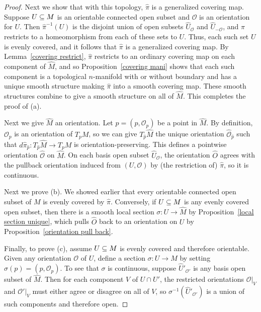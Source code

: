 \begin{proof}
Next we show that with this topology, $\widehat{\pi}$ is a generalized covering map. Suppose $U\subseteq M$ is an orientable connected open subset and $\mathcal{O}$ is an orientation for $U$. Then $\widehat{\pi}^{-1}(U)$ is the disjoint union of open subsets $\widehat{U}_{\mathcal{O}}$ and $\widehat{U}_{-\mathcal{O}}$, and $\widehat{\pi}$ restricts to a homeomorphism from each of these sets to $U$. Thus, each such set $U$ is evenly covered, and it follows that $\widehat{\pi}$ is a generalized covering map. By Lemma~\ref{covering restrict}, $\widehat{\pi}$ restricts to an ordinary covering map on each component of $\widehat{M}$, and so Proposition~\ref{covering mani} shows that each such component is a topological $n$-manifold with or without boundary and has a unique smooth structure making $\widehat{\pi}$ into a smooth covering map. These smooth structures combine to give a smooth structure on all of $\widehat{M}$. This completes the proof of (a).\par
Next we give $\widehat{M}$ an orientation. Let $\widehat{p}=(p,\mathcal{O}_p)$ be a point in $\widehat{M}$. By definition, $\mathcal{O}_p$ is an orientation of $T_pM$, so we can give $T_{\widehat{p}}\widehat{M}$ the unique orientation $\widehat{\mathcal{O}}_{\widehat{p}}$ such that $d\widehat{\pi}_{\widehat{p}}:T_{\widehat{p}}\widehat{M}\to T_pM$ is orientation-preserving. This defines a pointwise orientation $\widehat{\mathcal{O}}$ on $\widehat{M}$. On each basis open subset $\widehat{U}_{\mathcal{O}}$, the orientation $\widehat{O}$ agrees
with the pullback orientation induced from $(U,\mathcal{O})$ by (the restriction of) $\widehat{\pi}$, so it is continuous.\par
Next we prove (b). We showed earlier that every orientable connected open subset
of $M$ is evenly covered by $\widehat{\pi}$. Conversely, if $U\subseteq M$ is any evenly covered open subset, then there is a smooth local section $\sigma:U\to\widehat{M}$ by Proposition~\ref{local section unique}, which pulls $\widehat{O}$ back to an orientation on $U$ by Proposition~\ref{orientation pull back}.\par 
Finally, to prove (c), assume $U\subseteq M$ is evenly covered and therefore orientable. Given any orientation $\mathcal{O}$ of $U$, define a section $\sigma:U\to M$ by setting $\sigma(p)=(p,\mathcal{O}_p)$. To see that $\sigma$ is continuous, suppose $\widehat{U}'_{\mathcal{O}'}$ is any basis open subset of $\widehat{M}$. Then for each component $V$ of $U\cap U'$, the restricted orientations $\mathcal{O}|_V$ and $\mathcal{O}'|_V$ must either agree or disagree on all of $V$, so $\sigma^{-1}(\widehat{U}'_{\mathcal{O}'})$ is a union of such components and therefore open.
\end{proof}
